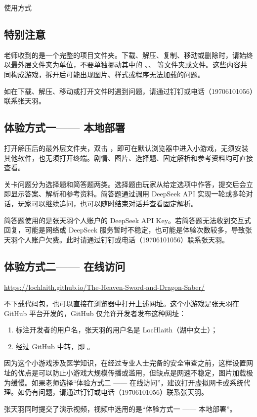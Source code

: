 \begin{center}
  \fronttitlefont 使\hspace{1.5em}用\hspace{1.5em}方\hspace{1.5em}式
\end{center}
\vspace{0.8em}

\subsection*{特别注意}

老师收到的是一个完整的项目文件夹。下载、解压、复制、移动或删除时，请始终以最外层文件夹为单位，不要单独挪动其中的 、、 等文件夹或文件。这些内容共同构成游戏，拆开后可能出现图片、样式或程序无法加载的问题。

如在下载、解压、移动或打开文件时遇到问题，请通过钉钉或电话（19706101056）联系张天羽。

\subsection*{体验方式一\quad —— \quad 本地部署}

打开解压后的最外层文件夹，双击 ，即可在默认浏览器中进入小游戏，无须安装其他软件，也无须打开终端。剧情、图片、选择题、固定解析和参考资料均可直接查看。

关卡问题分为选择题和简答题两类。选择题由玩家从给定选项中作答，提交后会立即显示答案、解析和参考资料。简答题通过调用 DeepSeek API 实现一轮或多轮对话，玩家可以继续追问，也可以随时结束对话并查看固定解析。

简答题使用的是张天羽个人账户的 DeepSeek API Key。若简答题无法收到交互式回复，可能是网络或 DeepSeek 服务暂时不稳定，也可能是体验次数较多，导致张天羽个人账户欠费。此时请通过钉钉或电话（19706101056）联系张天羽。

\subsection*{体验方式二\quad —— \quad 在线访问}

\begin{center}
\url{https://lochlaith.github.io/The-Heaven-Sword-and-Dragon-Saber/}
\end{center}

不下载代码包，也可以直接在浏览器中打开上述网址。这个小游戏是张天羽在 GitHub 平台开发的，GitHub 仅允许开发者发布这种网址：

\begin{enumerate}[leftmargin=*]
  \item 标注开发者的用户名，张天羽的用户名是 LocHlaith（湖中女士）；
  \item 经过 GitHub 中转，即 。
\end{enumerate}

因为这个小游戏涉及医学知识，在经过专业人士完备的安全审查之前，这样设置网址的优点是可以防止小游戏大规模传播或滥用，但缺点是网速不稳定，图片加载极为缓慢。如果老师选择“体验方式二 \quad —— \quad 在线访问”，建议打开虚拟网卡或系统代理。如仍有问题，请通过钉钉或电话（19706101056）联系张天羽。

张天羽同时提交了演示视频，视频中选用的是“体验方式一 \quad —— \quad 本地部署”。
